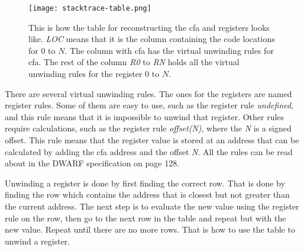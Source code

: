 \begin{figure}[h]
	\centering
	\texttt{[image: stacktrace-table.png]}
	\caption{This is how the table for reconstructing the \gls{cfa} and registers looks like. \emph{LOC} means that it is the column containing the code locations for $0$ to $N$. The column with \gls{cfa} has the virtual unwinding rules for \gls{cfa}. The rest of the column \emph{R0} to \emph{RN} holds all the virtual unwinding rules for the register $0$ to $N$.}
	\label{fig:stacktracetable}
\end{figure}


There are several virtual unwinding rules.
The ones for the registers are named register rules.
Some of them are easy to use, such as the register rule \emph{undefined}, and this rule means that it is impossible to unwind that register.
Other rules require calculations, such as the register rule \emph{offset(N)}, where the \emph{N} is a signed offset.
This rule means that the register value is stored at an address that can be calculated by adding the \gls{cfa} address and the offset \emph{N}.
All the rules can be read about in the \gls{DWARF} specification \cite{dwarf} on page 128.


Unwinding a register is done by first finding the correct row.
That is done by finding the row which contains the address that is closest but not greater than the current address.
The next step is to evaluate the new value using the register rule on the row, then go to the next row in the table and repeat but with the new value.
Repeat until there are no more rows.
That is how to use the table to unwind a register.
